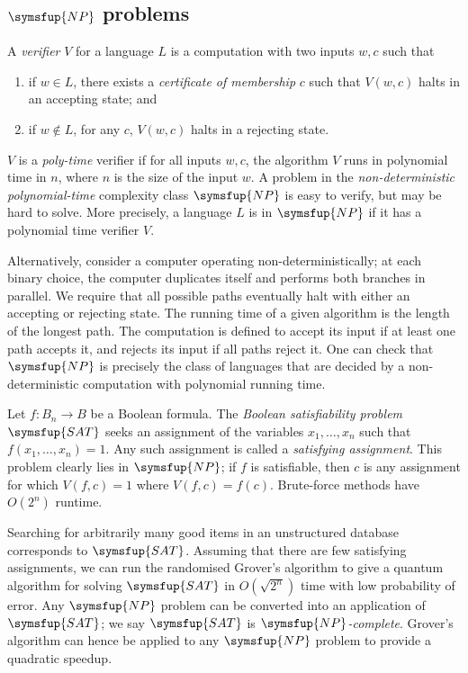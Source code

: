 \subsection{\texorpdfstring{\( \symsfup{NP} \)}{NP} problems}
A \emph{verifier} \( V \) for a language \( L \) is a computation with two inputs \( w, c \) such that
\begin{enumerate}
    \item if \( w \in L \), there exists a \emph{certificate of membership} \( c \) such that \( V(w,c) \) halts in an accepting state; and
    \item if \( w \not\in L \), for any \( c \), \( V(w,c) \) halts in a rejecting state.
\end{enumerate}
\( V \) is a \emph{poly-time} verifier if for all inputs \( w, c \), the algorithm \( V \) runs in polynomial time in \( n \), where \( n \) is the size of the input \( w \).
A problem in the \emph{non-deterministic polynomial-time} complexity class \( \symsfup{NP} \) is easy to verify, but may be hard to solve.
More precisely, a language \( L \) is in \( \symsfup{NP} \) if it has a polynomial time verifier \( V \).

Alternatively, consider a computer operating non-deterministically; at each binary choice, the computer duplicates itself and performs both branches in parallel.
We require that all possible paths eventually halt with either an accepting or rejecting state.
The running time of a given algorithm is the length of the longest path.
The computation is defined to accept its input if at least one path accepts it, and rejects its input if all paths reject it.
One can check that \( \symsfup{NP} \) is precisely the class of languages that are decided by a non-deterministic computation with polynomial running time.

Let \( f \colon B_n \to B \) be a Boolean formula.
The \emph{Boolean satisfiability problem} \( \symsfup{SAT} \) seeks an assignment of the variables \( x_1, \dots, x_n \) such that \( f(x_1, \dots, x_n) = 1 \).
Any such assignment is called a \emph{satisfying assignment}.
This problem clearly lies in \( \symsfup{NP} \); if \( f \) is satisfiable, then \( c \) is any assignment for which \( V(f,c) = 1 \) where \( V(f,c) = f(c) \).
Brute-force methods have \( O(2^n) \) runtime.

Searching for arbitrarily many good items in an unstructured database corresponds to \( \symsfup{SAT} \).
Assuming that there are few satisfying assignments, we can run the randomised Grover's algorithm to give a quantum algorithm for solving \( \symsfup{SAT} \) in \( O(\sqrt{2^n}) \) time with low probability of error.
Any \( \symsfup{NP} \) problem can be converted into an application of \( \symsfup{SAT} \); we say \( \symsfup{SAT} \) is \emph{\( \symsfup{NP} \)-complete}.
Grover's algorithm can hence be applied to any \( \symsfup{NP} \) problem to provide a quadratic speedup.

